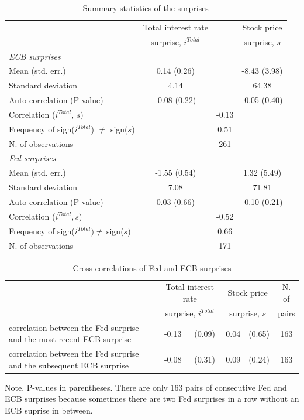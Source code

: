 \documentclass[a4paper,12pt]{article}
\begin{document}
\begin{table}[!htbp]
\begin{center}
\caption{Summary statistics of the surprises}\label{tab: surprises summary stats}
\begin{tabular}{lccc} \toprule
 & Total interest rate & & Stock price \\
 &  surprise, $i^{Total}$ & & surprise, $s$ \\
\midrule
\emph{ECB surprises}\\
Mean (std. err.) & 0.14 (0.26) & & -8.43 (3.98) \\
Standard deviation & 4.14 & & 64.38 \\
Auto-correlation (P-value) & -0.08 (0.22) & & -0.05 (0.40) \\
Correlation ($i^{Total}$, $s$) & & -0.13 \\
Frequency of sign($i^{Total}$) $\ne$ sign($s$) & & 0.51 \\
N. of observations & & 261 \\
\midrule
\emph{Fed surprises}\\
Mean (std. err.) & -1.55 (0.54) & & 1.32 (5.49) \\
Standard deviation & 7.08 & & 71.81 \\
Auto-correlation (P-value) & 0.03 (0.66) & & -0.10 (0.21) \\
Correlation ($i^{Total},s$) & & -0.52 \\
Frequency of sign($i^{Total})\ne\,$sign($s$) & & 0.66 \\
N. of observations & & 171 \\
\bottomrule
\end{tabular}
\end{center}
\end{table}


\begin{table}[!htbp]
\begin{center}
\caption{Cross-correlations of Fed and ECB surprises}\label{tab: surprises correlations}
\begin{tabular}{p{7cm}ccccc} \toprule
 & \multicolumn{2}{c}{Total interest rate} &  \multicolumn{2}{c}{Stock price} & N. of\\
 &  \multicolumn{2}{c}{surprise, $i^{Total}$} &  \multicolumn{2}{c}{surprise, $s$} & pairs \\
\midrule
correlation between the Fed surprise and the most recent ECB surprise & -0.13 & (0.09) & 0.04 & (0.65) & 163 \\
correlation between the Fed surprise and the subsequent ECB surprise & -0.08 & (0.31) & 0.09 & (0.24) & 163 \\
\bottomrule
\end{tabular}
\end{center}\footnotesize
Note. P-values in parentheses. There are only 163 pairs of consecutive Fed and ECB surprises because sometimes there are two Fed surprises in a row without an ECB suprise in between.
\end{table}
\end{document}
